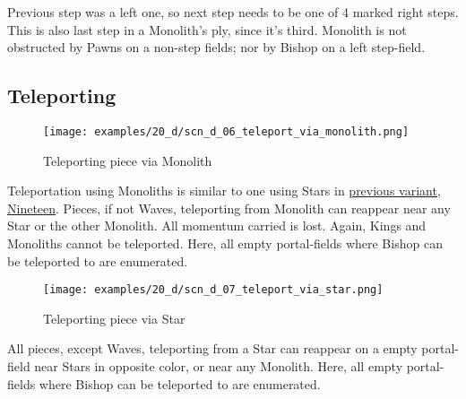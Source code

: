 Previous step was a left one, so next step needs to be one of 4 marked right
steps. This is also last step in a Monolith's ply, since it's third. Monolith
is not obstructed by Pawns on a non-step fields; nor by Bishop on a left
step-field.

\clearpage %

\subsection*{Teleporting}

\vspace*{-0.9\baselineskip}
\noindent
\begin{figure}[!h]
\texttt{[image: examples/20\_d/scn\_d\_06\_teleport\_via\_monolith.png]}
\caption{Teleporting piece via Monolith}
\label{fig:scn_d_06_teleport_via_monolith}
\end{figure}

Teleportation using Monoliths is similar to one using Stars in \hyperref[fig:scn_n_02_teleport_init]{previous variant, Nineteen}.
Pieces, if not Waves, teleporting from Monolith can reappear near any Star or the other Monolith.
All momentum carried is lost. Again, Kings and Monoliths cannot be teleported.
Here, all empty portal-fields where Bishop can be teleported to are enumerated.

\clearpage %

\noindent
\begin{figure}[!h]
\texttt{[image: examples/20\_d/scn\_d\_07\_teleport\_via\_star.png]}
\caption{Teleporting piece via Star}
\label{fig:scn_d_07_teleport_via_star}
\end{figure}

All pieces, except Waves, teleporting from a Star can reappear on a empty portal-field
near Stars in opposite color, or near any Monolith.
Here, all empty portal-fields where Bishop can be teleported to are enumerated.

\clearpage %

